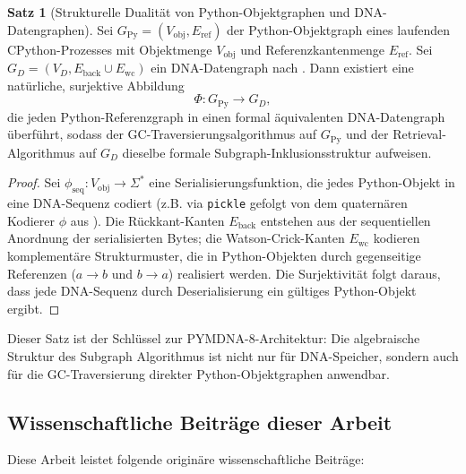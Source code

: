 ﻿\documentclass[a4paper,12pt]{article}
\theoremstyle{definition}
\newtheorem{satz}{Satz}[section]
\begin{document}
\begin{satz}[Strukturelle Dualität von Python-Objektgraphen und DNA-Datengraphen]
  \label{satz:dualitaet}
  Sei $G_{\mathrm{Py}} = (V_{\mathrm{obj}}, E_{\mathrm{ref}})$ der
  Python-Objektgraph eines laufenden CPython-Prozesses mit Objektmenge
  $V_{\mathrm{obj}}$ und Referenzkantenmenge $E_{\mathrm{ref}}$.
  Sei $G_D = (V_D, E_{\mathrm{back}} \cup E_{\mathrm{wc}})$ ein DNA-Datengraph
  nach \cite{epp2026dnastor}.
  Dann existiert eine natürliche, surjektive Abbildung
  \[
    \Phi: G_{\mathrm{Py}} \to G_D,
  \]
  die jeden Python-Referenzgraph in einen formal äquivalenten DNA-Datengraph
  überführt, sodass der GC-Traversierungsalgorithmus auf $G_{\mathrm{Py}}$
  und der Retrieval-Algorithmus auf $G_D$ dieselbe formale Subgraph-Inklusionsstruktur
  aufweisen.
\end{satz}

\begin{proof}
  Sei $\phi_{\mathrm{seq}}: V_{\mathrm{obj}} \to \Sigma^*$ eine Serialisierungsfunktion,
  die jedes Python-Objekt in eine DNA-Sequenz codiert (z.B. via \texttt{pickle}
  gefolgt von dem quaternären Kodierer $\phi$ aus \cite{epp2026dnastor}).
  Die Rückkant-Kanten $E_{\mathrm{back}}$ entstehen aus der sequentiellen
  Anordnung der serialisierten Bytes; die Watson-Crick-Kanten $E_{\mathrm{wc}}$
  kodieren komplementäre Strukturmuster, die in Python-Objekten durch
  gegenseitige Referenzen ($a \to b$ und $b \to a$) realisiert werden.
  Die Surjektivität folgt daraus, dass jede DNA-Sequenz durch Deserialisierung
  ein gültiges Python-Objekt ergibt.
\end{proof}

Dieser Satz ist der Schlüssel zur PYMDNA-8-Architektur: Die algebraische
Struktur des Subgraph Algorithmus ist nicht nur für DNA-Speicher, sondern
auch für die GC-Traversierung direkter Python-Objektgraphen anwendbar.

\subsection{Wissenschaftliche Beiträge dieser Arbeit}

Diese Arbeit leistet folgende originäre wissenschaftliche Beiträge:
\end{document}
